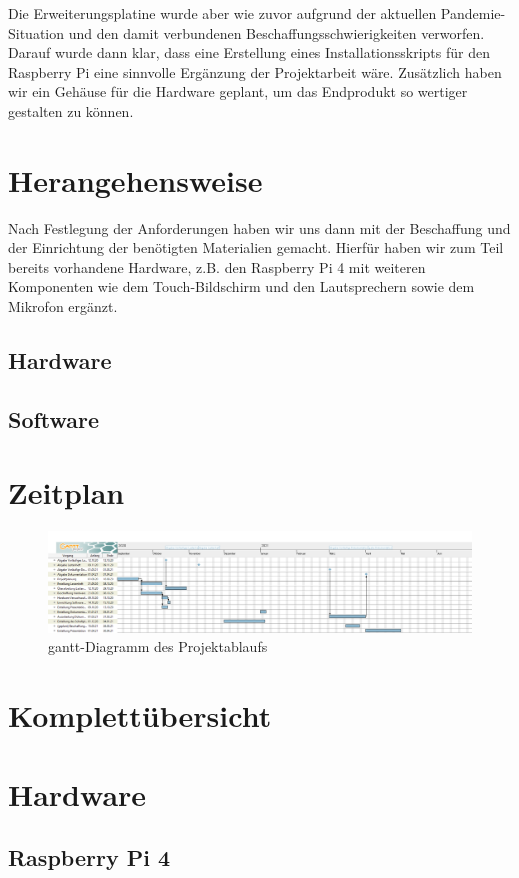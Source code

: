 \documentclass[12pt,a4paper]{article}
\begin{document}
	Die Erweiterungsplatine wurde aber wie zuvor aufgrund der aktuellen Pandemie-Situation und den damit verbundenen Beschaffungsschwierigkeiten verworfen.
	Darauf wurde dann klar, dass eine Erstellung eines Installationsskripts für den Raspberry Pi eine sinnvolle Ergänzung der Projektarbeit wäre. Zusätzlich haben wir ein Gehäuse für die Hardware geplant, um das Endprodukt so wertiger gestalten zu können.
	\newpage
	\section{Herangehensweise}
	Nach Festlegung der Anforderungen haben wir uns dann mit der Beschaffung und der Einrichtung der benötigten Materialien gemacht. Hierfür haben wir zum Teil bereits vorhandene Hardware, z.B. den Raspberry Pi 4 mit weiteren Komponenten wie dem Touch-Bildschirm und den Lautsprechern sowie dem Mikrofon ergänzt.
	\subsection{Hardware}
	\subsection{Software}
	\section{Zeitplan}
		\begin{figure}[htb]
			\includegraphics[width=1\textwidth]{TAR_FKMS_20202021.png}
			\caption[gantt-Diagramm des Projektablaufs]{gantt-Diagramm des Projektablaufs}
 			\label{fig:gantt-diagramm}
 		\end{figure}
	\section{Komplettübersicht}
	\section{Hardware}
	\subsection{Raspberry Pi 4}
\end{document}
